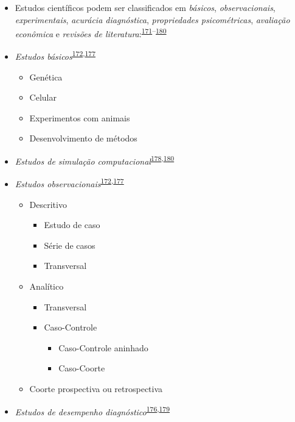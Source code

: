 \documentclass[
  a4paper,
]{book}
\begin{document}
\begin{itemize}
\item
  Estudos científicos podem ser classificados em \emph{básicos}, \emph{observacionais}, \emph{experimentais}, \emph{acurácia diagnóstica}, \emph{propriedades psicométricas}, \emph{avaliação econômica} e \emph{revisões de literatura}:\textsuperscript{\protect\hyperlink{ref-Grant2009}{171}--\protect\hyperlink{ref-chipman2022}{180}}
\item
  \emph{Estudos básicos}\textsuperscript{\protect\hyperlink{ref-Suxfct2014}{172},\protect\hyperlink{ref-Chidambaram2019}{177}}

  \begin{itemize}
  \item
    Genética
  \item
    Celular
  \item
    Experimentos com animais
  \item
    Desenvolvimento de métodos
  \end{itemize}
\item
  \emph{Estudos de simulação computacional}\textsuperscript{\protect\hyperlink{ref-Erdemir2020}{178},\protect\hyperlink{ref-chipman2022}{180}}
\item
  \emph{Estudos observacionais}\textsuperscript{\protect\hyperlink{ref-Suxfct2014}{172},\protect\hyperlink{ref-Chidambaram2019}{177}}

  \begin{itemize}
  \item
    Descritivo

    \begin{itemize}
    \item
      Estudo de caso
    \item
      Série de casos
    \item
      Transversal
    \end{itemize}
  \item
    Analítico

    \begin{itemize}
    \item
      Transversal
    \item
      Caso-Controle

      \begin{itemize}
      \item
        Caso-Controle aninhado
      \item
        Caso-Coorte
      \end{itemize}
    \end{itemize}
  \item
    Coorte prospectiva ou retrospectiva
  \end{itemize}
\item
  \emph{Estudos de desempenho diagnóstico}\textsuperscript{\protect\hyperlink{ref-Chassuxe92019}{176},\protect\hyperlink{ref-Yang2021}{179}}


\end{itemize}
\end{document}

